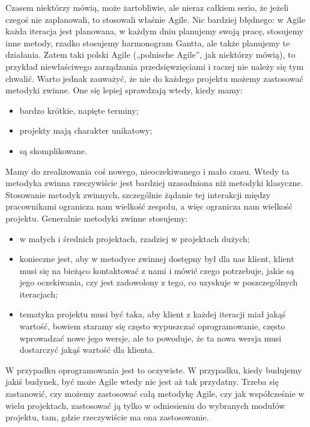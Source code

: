 Czasem niektórzy mówią, może żartobliwie, ale nieraz całkiem serio, że jeżeli czegoś nie zaplanowali, to stosowali właśnie Agile. Nic bardziej błędnego: w Agile każda iteracja jest planowana, w każdym dniu planujemy swoją pracę, stosujemy inne metody, rzadko stosujemy harmonogram Gantta, ale także planujemy te działania. Zatem taki polski Agile („polnische Agile”, jak niektórzy mówią), to przykład niewłaściwego zarządzania przedsięwzięciami i raczej nie należy się tym chwalić.
Warto jednak zauważyć, że nie do każdego projektu możemy zastosować metodyki zwinne. One się lepiej sprawdzają wtedy, kiedy mamy:
\begin{itemize}
	\item bardzo krótkie, napięte terminy;
	\item projekty mają charakter unikatowy;
	\item są skomplikowane.
\end{itemize}

Mamy do zrealizowania coś nowego, nieoczekiwanego i mało czasu. Wtedy ta metodyka zwinna rzeczywiście jest bardziej uzasadniona niż metodyki klasyczne. Stosowanie metodyk zwinnych, szczególnie żądanie tej interakcji między pracownikami ogranicza nam wielkość zespołu, a więc ogranicza nam wielkość projektu. Generalnie metodyki zwinne stosujemy:
\begin{itemize}
	\item w małych i średnich projektach, rzadziej w projektach dużych;
	\item konieczne jest, aby w metodyce zwinnej dostępny był dla nas klient, klient musi się na bieżąco kontaktować z nami i mówić czego potrzebuje, jakie są jego oczekiwania, czy jest zadowolony z tego, co uzyskuje w poszczególnych iteracjach;

	\item tematyka projektu musi być taka, aby klient z każdej iteracji miał jakąś wartość, bowiem staramy się często wypuszczać oprogramowanie, często wprowadzać nowe jego wersje, ale to powoduje, że ta nowa wersja musi dostarczyć jakąś wartość dla klienta.
\end{itemize}
W przypadku oprogramowania jest to oczywiste. W przypadku, kiedy budujemy jakiś budynek, być może Agile wtedy nie jest aż tak przydatny. Trzeba się zastanowić, czy możemy zastosować całą metodykę Agile, czy jak współcześnie w wielu projektach, zastosować ją tylko w odniesieniu do wybranych modułów projektu, tam, gdzie rzeczywiście ma ona zastosowanie.\cite{Cohen_2006}